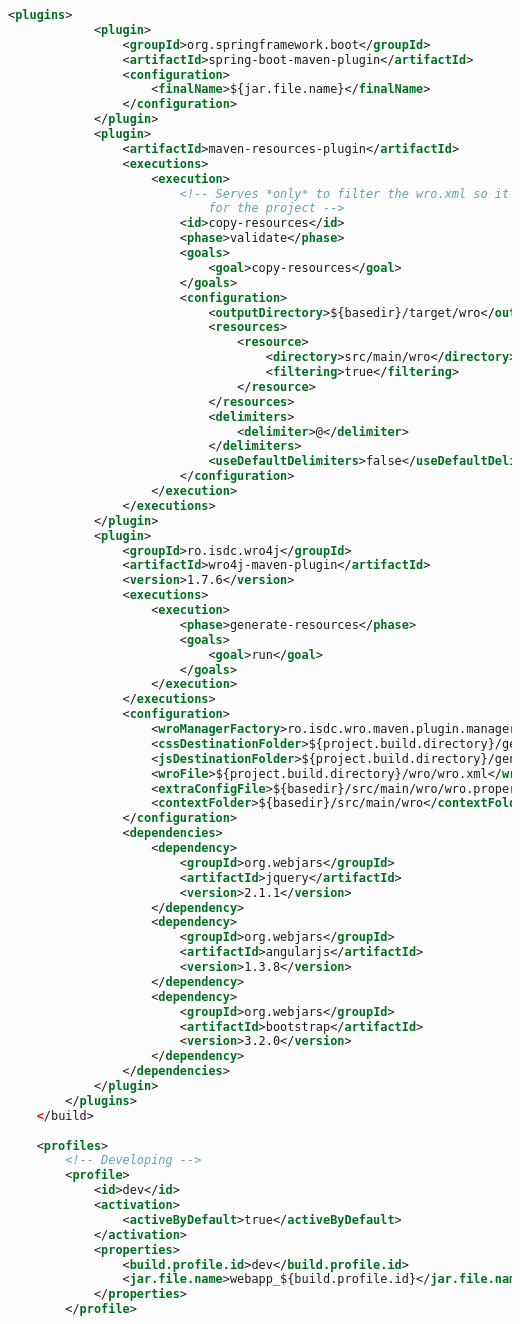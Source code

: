 \begin{lstlisting}[language=XML, caption={Configuración de la aplicación web}, label={lst:maven-spring-boot-webapp}]
		<plugins>
			<plugin>
				<groupId>org.springframework.boot</groupId>
				<artifactId>spring-boot-maven-plugin</artifactId>
				<configuration>
					<finalName>${jar.file.name}</finalName>
				</configuration>
			</plugin>
			<plugin>
				<artifactId>maven-resources-plugin</artifactId>
				<executions>
					<execution>
						<!-- Serves *only* to filter the wro.xml so it can get an absolute path 
							for the project -->
						<id>copy-resources</id>
						<phase>validate</phase>
						<goals>
							<goal>copy-resources</goal>
						</goals>
						<configuration>
							<outputDirectory>${basedir}/target/wro</outputDirectory>
							<resources>
								<resource>
									<directory>src/main/wro</directory>
									<filtering>true</filtering>
								</resource>
							</resources>
							<delimiters>
								<delimiter>@</delimiter>
							</delimiters>
							<useDefaultDelimiters>false</useDefaultDelimiters>
						</configuration>
					</execution>
				</executions>
			</plugin>
			<plugin>
				<groupId>ro.isdc.wro4j</groupId>
				<artifactId>wro4j-maven-plugin</artifactId>
				<version>1.7.6</version>
				<executions>
					<execution>
						<phase>generate-resources</phase>
						<goals>
							<goal>run</goal>
						</goals>
					</execution>
				</executions>
				<configuration>
					<wroManagerFactory>ro.isdc.wro.maven.plugin.manager.factory.ConfigurableWroManagerFactory</wroManagerFactory>
					<cssDestinationFolder>${project.build.directory}/generated-resources/static/css</cssDestinationFolder>
					<jsDestinationFolder>${project.build.directory}/generated-resources/static/js</jsDestinationFolder>
					<wroFile>${project.build.directory}/wro/wro.xml</wroFile>
					<extraConfigFile>${basedir}/src/main/wro/wro.properties</extraConfigFile>
					<contextFolder>${basedir}/src/main/wro</contextFolder>
				</configuration>
				<dependencies>
					<dependency>
						<groupId>org.webjars</groupId>
						<artifactId>jquery</artifactId>
						<version>2.1.1</version>
					</dependency>
					<dependency>
						<groupId>org.webjars</groupId>
						<artifactId>angularjs</artifactId>
						<version>1.3.8</version>
					</dependency>
					<dependency>
						<groupId>org.webjars</groupId>
						<artifactId>bootstrap</artifactId>
						<version>3.2.0</version>
					</dependency>
				</dependencies>
			</plugin>
		</plugins>
	</build>
	
	<profiles>
		<!-- Developing -->
		<profile>
			<id>dev</id>
			<activation>
				<activeByDefault>true</activeByDefault>
			</activation>
			<properties>
				<build.profile.id>dev</build.profile.id>
				<jar.file.name>webapp_${build.profile.id}</jar.file.name>
			</properties>
		</profile>
		

\end{lstlisting}

